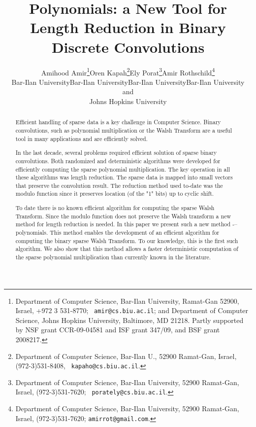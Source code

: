 \documentclass[11pt,amssymb]{article}
\begin{document}
\title{Polynomials: a New Tool for Length Reduction in Binary Discrete
Convolutions}

\author{
\begin{tabular}{cccc}
Amihood Amir\thanks{ Department of Computer Science, Bar-Ilan
University, Ramat-Gan 52900, Israel, +972 3 531-8770; {\tt
amir@cs.biu.ac.il}; and Department of Computer Science, Johns Hopkins
University, Baltimore, MD 21218. Partly supported by NSF grant
CCR-09-04581 and ISF grant 347/09, and BSF grant 2008217.}
&
Oren Kapah\thanks{Department of Computer Science,
Bar-Ilan U., 52900 Ramat-Gan, Israel, (972-3)531-8408, {\tt
kapaho@cs.biu.ac.il}.}
&
Ely Porat\thanks{ Department of Computer Science, Bar-Ilan
University, 52900 Ramat-Gan, Israel, (972-3)531-7620; {\tt
porately@cs.biu.ac.il}.}
&
Amir Rothschild\thanks{ Department of
Computer Science, Bar-Ilan University, 52900 Ramat-Gan, Israel,
(972-3)531-7620; {\tt amirrot@gmail.com}.}
\\
{\small Bar-Ilan University} & {\small Bar-Ilan University}
& {\small   Bar-Ilan University} & {\small Bar-Ilan University}\\
{\small and} \\
{\small Johns Hopkins University} \\
\end{tabular}
}


\date{}

\maketitle
\begin{abstract}
Efficient handling of sparse data is a key challenge in Computer Science.
Binary convolutions, such as polynomial multiplication or the Walsh
Transform are a useful tool in many applications and are efficiently solved.

In the last decade, several problems required efficient solution of
sparse binary convolutions. Both randomized and deterministic
algorithms were developed for efficiently computing the sparse
polynomial multiplication.
The key operation in all these algorithms was length reduction. The
sparse data is mapped into small vectors that preserve the convolution
result. The reduction method used to-date was the modulo function
since it preserves location (of the "1" bits) up to cyclic shift.

To date there is no known efficient algorithm for computing the sparse
Walsh Transform. Since the modulo function does not preserve the Walsh
transform a new method for length reduction is needed.
In this paper we present such a new method -– polynomials.
This method enables the development of an efficient algorithm for
computing the binary sparse Walsh Transform. To our knowledge, this is
the first such algorithm. We also show that this method allows a
faster deterministic computation of the sparse polynomial
multiplication than currently known in the literature.  

\end{abstract}
\end{document}
